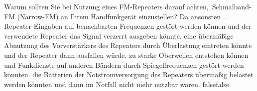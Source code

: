     {Warum sollten Sie bei Nutzung eines FM-Repeaters darauf achten, Schmalband-FM (Narrow-FM) an Ihrem Handfunkgerät einzustellen? Da ansonsten ...}
    {Repeater-Eingaben auf benachbarten Frequenzen gestört werden können und der verwendete Repeater das Signal verzerrt ausgeben könnte.}
    {eine übermäßige Abnutzung des Vorverstärkers des Repeaters durch Überlastung eintreten könnte und der Repeater dann ausfallen würde.}
    {zu starke Oberwellen entstehen können und Funkdienste auf anderen Bändern durch Spiegelfrequenzen gestört werden könnten.}
    {die Batterien der Notstromversorgung des Repeaters übermäßig belastet werden könnten und dann im Notfall nicht mehr nutzbar wären.}
    {false}{false}
